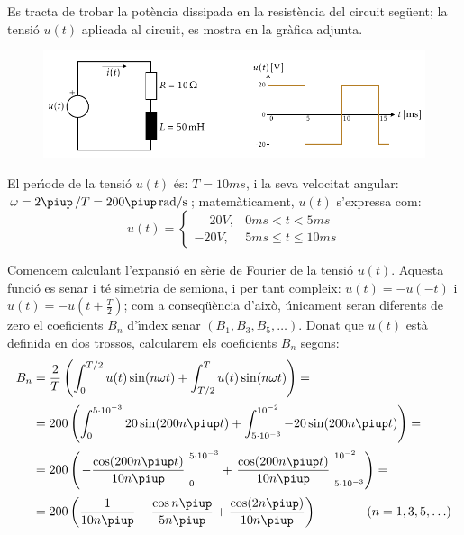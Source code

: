 \vspace{2mm}
\begin{exemple}
 Es tracta de trobar la pot\`{e}ncia
 dissipada en la resist\`{e}ncia del circuit seg\"{u}ent; la tensi\'{o} $u(t)$ aplicada al circuit,
 es mostra en la gr\`{a}fica adjunta.

\begin{figure}[h]
\centering
    \includegraphics{Imatges/Cap-Fourier-Exemple-Circuit.pdf}
\end{figure}

 El per\'{\i}ode de la tensi\'{o} $u(t)$ \'{e}s: $T=10\unit{ms}$, i la
seva velocitat angular: $\omega = 2\piup\,/T = 200\piup\unit{rad/s}$;
matem\`{a}ticament, $u(t)$ s'expressa com:
\[
u(t) = \begin{cases} \phantom{-}20\unit{V}, & 0\unit{ms} < t < 5\unit{ms} \\
       -20\unit{V}, & 5\unit{ms} \leq t \leq 10\unit{ms} \end{cases}
\]

Comencem calculant l'expansi\'{o} en s\`{e}rie de Fourier de la tensi\'{o}
$u(t)$. Aquesta funci\'{o} es senar i t\'{e} simetria de semiona, i per tant
 compleix: $u(t)=-u(-t)$ i $u(t) = -u(t+\frac{T}{2})$; com a
conseq\"{u}\`{e}ncia d'aix\`{o}, \'{u}nicament seran diferents de zero el
coeficients $B_n$ d'\'{\i}ndex senar $(B_1,B_3,B_5,\ldots)$. Donat que
$u(t)$ est\`{a} definida en dos trossos, calcularem els coeficients
$B_n$ segons:
\[
\begin{split}
    B_n &= \frac{2}{T} \left( \int_0^{T/2} u(t) \sin(n \omega t) +
    \int_{T/2}^{T} u(t) \sin(n \omega t) \right) =\\[0.5ex]
    &= 200 \left( \int_0^{5\cdot 10^{-3}} 20 \sin(200 n \piup t) +
    \int_{5\cdot 10^{-3}}^{10^{-2}} -20 \sin(200 n \piup t) \right) =\\[0.5ex]
    &= 200 \left( \left. -\frac{\cos(200 n \piup t)}{10 n \piup}\right|_0^{5\cdot 10^{-3}}
    +  \left.\frac{\cos(200 n \piup t)}{10 n \piup}\right|_{5\cdot
    10^{-3}}^{10^{-2}}\right)=\\[0.5ex]
    &= 200\left( \frac{1}{10 n \piup} - \frac{\cos n \piup}{5 n \piup} +
    \frac{\cos (2 n \piup)}{10 n \piup}\right)
    \qquad\qquad(n=1,3,5,\ldots)
\end{split}
\]


\end{exemple}
